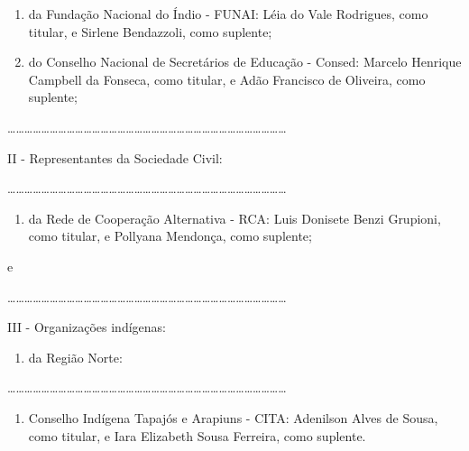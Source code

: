 \documentclass[
]{book}
\providecommand{\tightlist}{%
  \setlength{\itemsep}{0pt}\setlength{\parskip}{0pt}}
\begin{document}
\begin{enumerate}
\def\labelenumi{\alph{enumi})}
\setcounter{enumi}{5}
\item
  da Fundação Nacional do Índio - FUNAI: Léia do Vale Rodrigues, como titular, e Sirlene Bendazzoli, como suplente;
\item
  do Conselho Nacional de Secretários de Educação - Consed: Marcelo Henrique Campbell da Fonseca, como titular, e Adão Francisco de Oliveira, como suplente;
\end{enumerate}

\ldots\ldots\ldots\ldots\ldots\ldots\ldots\ldots\ldots\ldots\ldots\ldots\ldots\ldots\ldots\ldots\ldots\ldots\ldots\ldots\ldots\ldots\ldots\ldots\ldots\ldots\ldots\ldots\ldots\ldots\ldots\ldots\ldots{}

II - Representantes da Sociedade Civil:

\ldots\ldots\ldots\ldots\ldots\ldots\ldots\ldots\ldots\ldots\ldots\ldots\ldots\ldots\ldots\ldots\ldots\ldots\ldots\ldots\ldots\ldots\ldots\ldots\ldots\ldots\ldots\ldots\ldots\ldots\ldots\ldots\ldots{}

\begin{enumerate}
\def\labelenumi{\alph{enumi})}
\setcounter{enumi}{3}
\tightlist
\item
  da Rede de Cooperação Alternativa - RCA: Luis Donisete Benzi Grupioni, como titular, e Pollyana Mendonça, como suplente;
\end{enumerate}

e

\ldots\ldots\ldots\ldots\ldots\ldots\ldots\ldots\ldots\ldots\ldots\ldots\ldots\ldots\ldots\ldots\ldots\ldots\ldots\ldots\ldots\ldots\ldots\ldots\ldots\ldots\ldots\ldots\ldots\ldots\ldots\ldots\ldots{}

III - Organizações indígenas:

\begin{enumerate}
\def\labelenumi{\alph{enumi})}
\tightlist
\item
  da Região Norte:
\end{enumerate}

\ldots\ldots\ldots\ldots\ldots\ldots\ldots\ldots\ldots\ldots\ldots\ldots\ldots\ldots\ldots\ldots\ldots\ldots\ldots\ldots\ldots\ldots\ldots\ldots\ldots\ldots\ldots\ldots\ldots\ldots\ldots\ldots\ldots{}

\begin{enumerate}
\def\labelenumi{\arabic{enumi}.}
\setcounter{enumi}{5}
\tightlist
\item
  Conselho Indígena Tapajós e Arapiuns - CITA: Adenilson Alves de Sousa, como titular, e Iara Elizabeth Sousa Ferreira, como suplente.
\end{enumerate}
\end{document}
